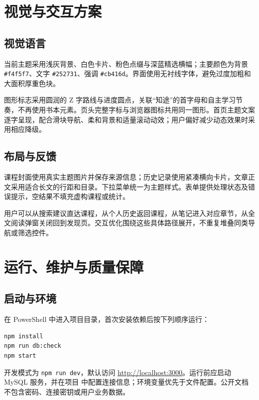 \documentclass[UTF8,12pt,a4paper,openany,oneside]{ctexbook}
\begin{document}
\chapter{视觉与交互方案}
\section{视觉语言}
当前主题采用浅灰背景、白色卡片、粉色点缀与深蓝精选横幅；主要颜色为背景 \texttt{\#f4f5f7}、文字 \texttt{\#252731}、强调 \texttt{\#cb416d}。界面使用无衬线字体，避免过度加粗和大面积厚重色块。

图形标志采用圆润的 Z 字路线与进度圆点，关联“知途”的首字母和自主学习节奏，不再使用书本元素。页头完整字标与浏览器图标共用同一图形。首页主题文案逐字呈现，配合滑块导航、柔和背景和适量滚动动效；用户偏好减少动态效果时采用相应降级。

\section{布局与反馈}
课程封面使用真实主题图片并保存来源信息；历史记录使用紧凑横向卡片，文章正文采用适合长文的行距和目录。下拉菜单统一为主题样式。表单提供处理状态及错误提示，空结果不填充虚构课程或统计。

用户可以从搜索建议直达课程，从个人历史返回课程，从笔记进入对应章节，从全文阅读弹窗关闭回到发现页。交互优化围绕这些具体路径展开，不重复堆叠同类导航或筛选控件。

\chapter{运行、维护与质量保障}
\section{启动与环境}
在 PowerShell 中进入项目目录，首次安装依赖后按下列顺序运行：
\begin{verbatim}
npm install
npm run db:check
npm start
\end{verbatim}
开发模式为 \texttt{npm run dev}，默认访问 \url{http://localhost:3000}。运行前应启动 MySQL 服务，并在项目  中配置连接信息；环境变量优先于文件配置。公开文档不包含密码、连接密钥或用户业务数据。
\end{document}
